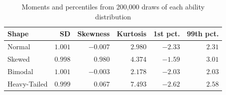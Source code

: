\begin{table}[htbp]\centering
\caption{Moments and percentiles from 200,000 draws of each ability distribution}
\label{tab:latent-shapes}
{\small\begin{tabular}{lrrrrr}
\toprule
Shape & SD & Skewness & Kurtosis & 1st pct. & 99th pct. \\
\midrule
Normal & $1.001$ & $-0.007$ & $2.980$ & $-2.33$ & $2.31$ \\
Skewed & $0.998$ & $0.980$ & $4.374$ & $-1.59$ & $3.01$ \\
Bimodal & $1.001$ & $-0.003$ & $2.178$ & $-2.03$ & $2.03$ \\
Heavy-Tailed & $0.999$ & $0.067$ & $7.493$ & $-2.62$ & $2.58$ \\
\bottomrule
\end{tabular}}
\end{table}
